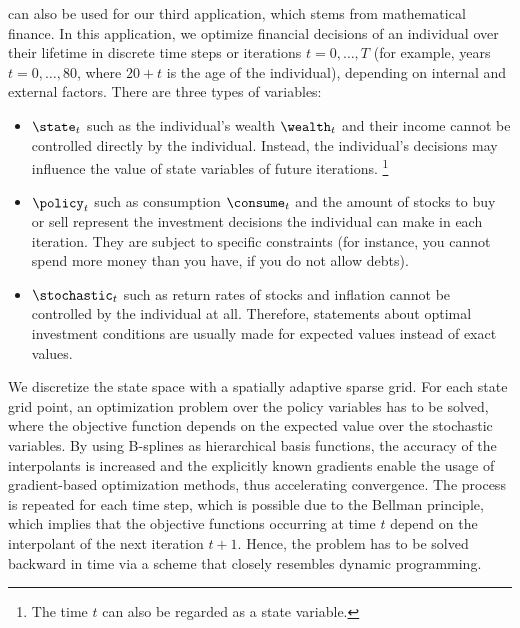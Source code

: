 
\label{chap:80finance}

can also be used for our third application,
which stems from mathematical finance.
In this application, we optimize financial decisions of an individual
over their lifetime in discrete time steps or iterations $t = 0, \dotsc, T$
(for example, years $t = 0, \dotsc, 80$, where $20+t$ is the age
of the individual), depending on internal and external factors.
There are three types of variables:

\begin{itemize}
  \item
   $\state_t$
  such as the individual's wealth $\wealth_t$ and their income
  cannot be controlled directly by the individual.
  Instead, the individual's decisions may influence the value of
  state variables of future iterations.%
  \footnote{%
    The time $t$ can also be regarded as a state variable.%
  }
  
  \item
   $\policy_t$
  such as consumption $\consume_t$ and the amount of stocks to buy or sell
  represent the investment decisions the individual can make in
  each iteration.
  They are subject to specific constraints
  (for instance, you cannot spend more money than you have,
  if you do not allow debts).
  
  \item
   $\stochastic_t$
  such as return rates of stocks and inflation
  cannot be controlled by the individual at all.
  Therefore, statements about optimal investment conditions
  are usually made for expected values instead of exact values.
\end{itemize}

\noindent
We discretize the state space with a spatially adaptive sparse grid.
For each state grid point, an optimization problem over the policy
variables has to be solved, where the objective function depends
on the expected value over the stochastic variables.
By using B-splines as hierarchical basis functions,
the accuracy of the interpolants is increased and
the explicitly known gradients enable the usage of
gradient-based optimization methods, thus accelerating convergence.
The process is repeated for each time step,
which is possible due to the Bellman principle,
which implies that the objective functions
occurring at time $t$ depend on the interpolant of the next iteration $t+1$.
Hence, the problem has to be solved backward in time
via a scheme that closely resembles dynamic programming.

